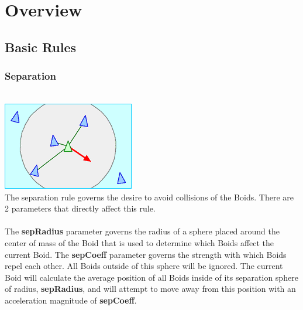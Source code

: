 \documentclass[12pt]{article}
\begin{document}
\section{Overview}
\subsection{Basic Rules}
\subsubsection{Separation}
\\ \includegraphics[width=\textwidth,height=\textheight,keepaspectratio]{Rule_separation.gif} \\
The separation rule governs the desire to avoid collisions of the Boids. There are 2 parameters that directly affect this rule.
\\ \\
The \textbf{sepRadius} parameter governs the radius of a sphere placed around the center of mass of the Boid that is used to determine which Boids affect the current Boid. The \textbf{sepCoeff} parameter governs the strength with which Boids repel each other. All Boids outside of this sphere will be ignored. The current Boid will calculate the average position of all Boids inside of its separation sphere of radius, \textbf{sepRadius}, and will attempt to move away from this position with an acceleration magnitude of \textbf{sepCoeff}.
\end{document}
